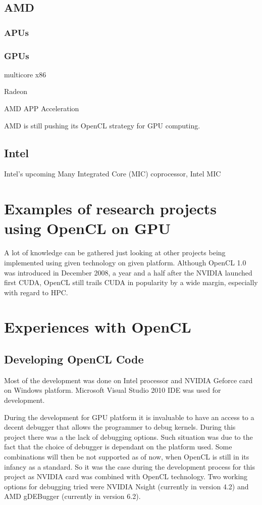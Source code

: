\subsection{AMD}

\subsubsection{APUs}

\subsubsection{GPUs}
multicore x86

Radeon

AMD APP Acceleration 

AMD is still pushing its OpenCL strategy for GPU computing. 

\subsection{Intel}
Intel's upcoming Many Integrated Core (MIC) coprocessor, Intel MIC



\section{Examples of research projects using OpenCL on GPU}
A lot of knowledge can be gathered just looking at other projects being implemented using given technology on given platform. Although OpenCL 1.0 was introduced in December 2008, a year and a half after the NVIDIA launched first CUDA, OpenCL still trails CUDA in popularity by a wide margin, especially with regard to HPC. 



\section{Experiences with OpenCL}
\subsection{Developing OpenCL Code}
Most of the development was done on Intel processor and NVIDIA Geforce card on Windows platform. Microsoft Visual Studio 2010 IDE was used for development.

During the development for GPU platform it is invaluable to have an access to a decent debugger that allows the programmer to debug kernels. During this project there was a the lack of debugging options. Such situation was due to the fact that the choice of debugger is dependant on the platform used. Some combinations will then be not supported as of now, when OpenCL is still in its infancy as a standard. So it was the case during the development process for this project as NVIDIA card was combined with OpenCL technology.  Two working options for debugging tried were NVIDIA Nsight (currently in version 4.2) and AMD gDEBugger (currently in version 6.2).

